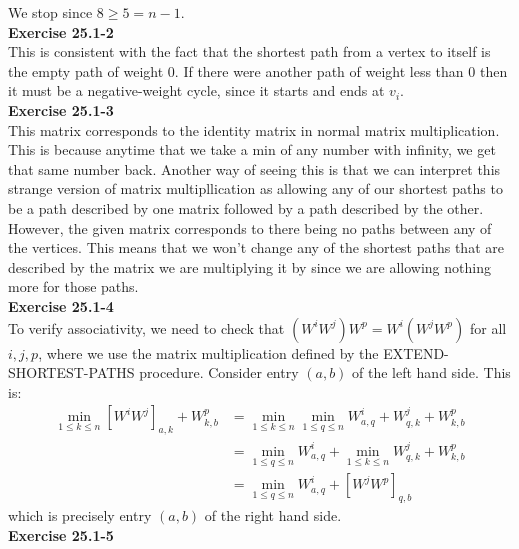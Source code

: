 \documentclass{article}
\begin{document}
We stop since $8\ge 5 =n-1$.\\

\noindent\textbf{Exercise 25.1-2}\\

This is consistent with the fact that the shortest path from a vertex to itself is the empty path of weight 0.  If there were another path of weight less than 0 then it must be a negative-weight cycle, since it starts and ends at $ v_i$.   \\

\noindent\textbf{Exercise 25.1-3}\\

This matrix corresponds to the identity matrix in normal matrix multiplication. This is because anytime that we take a min of any number with infinity, we get that same number back. Another way of seeing this is that we can interpret this strange version of matrix multipllication as allowing any of our shortest paths to be a path described by one matrix followed by a path described by the other. However, the given matrix corresponds to there being no paths between any of the vertices. This means that we won't change any of the shortest paths that are described by the matrix we are multiplying it by since we are allowing nothing more for those paths.\\

\noindent\textbf{Exercise 25.1-4}\\

To verify associativity, we need to check that $(W^iW^j)W^p= W^i(W^jW^p)$ for all $i, j, p$, where we use the matrix multiplication defined by the EXTEND-SHORTEST-PATHS procedure.  Consider entry $(a,b)$ of the left hand side.  This is:
\begin{align*}
\min_{1 \leq k \leq n} [W^iW^j]_{a,k} + W^p_{k,b}&=\min_{1 \leq k \leq n} \min_{1 \leq q \leq n} W^i_{a,q} + W^j_{q,k} + W^p_{k,b}\\
&= \min_{1 \leq q \leq n} W^i_{a,q} + \min_{1 \leq k \leq n}W^j_{q,k} + W^p_{k,b} \\
&= \min_{1 \leq q \leq n} W^i_{a,q} + [W^jW^p]_{q,b}
\end{align*}
which is precisely entry $(a,b)$ of the right hand side. \\

\noindent\textbf{Exercise 25.1-5}\\
\end{document}
